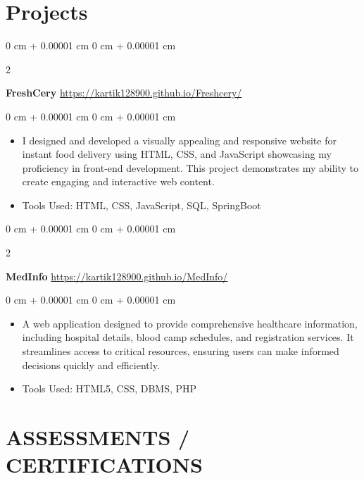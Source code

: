 \documentclass[10pt, letterpaper]{article}
\newenvironment{highlights}{
    \begin{itemize}[
        topsep=0.10 cm,
        parsep=0.10 cm,
        partopsep=0pt,
        itemsep=0pt,
        leftmargin=0 cm + 10pt
    ]
}{
    \end{itemize}
} %
\newenvironment{onecolentry}{
    \begin{adjustwidth}{
        0 cm + 0.00001 cm
    }{
        0 cm + 0.00001 cm
    }
}{
    \end{adjustwidth}
} %
\newenvironment{twocolentry}[2][]{
    \onecolentry
    \def\secondColumn{#2}
    \setcolumnwidth{\fill, 4.5 cm}
    \begin{paracol}{2}
}{
    \switchcolumn \raggedleft \secondColumn
    \end{paracol}
    \endonecolentry
} %
\begin{document}
    
    \section{Projects}



        
        \begin{twocolentry}{
            \href{https://github.com/sinaatalay/rendercv}{https://kartik128900.github.io/Freshcery/}
        }
            \textbf{FreshCery }\end{twocolentry}

        \begin{onecolentry}
            \begin{highlights}
                \item I designed and developed a visually appealing and responsive website for instant food delivery using HTML, CSS, and JavaScript showcasing my proficiency in front-end development. This project demonstrates my ability to create engaging and interactive web content.  
                \item Tools Used: HTML, CSS, JavaScript, SQL, SpringBoot 
            \end{highlights}
        \end{onecolentry}



        \begin{twocolentry}{
            \href{https://github.com/sinaatalay/rendercv}{https://kartik128900.github.io/MedInfo/}
        }
        
            \textbf{MedInfo }\end{twocolentry}

        \begin{onecolentry}
            \begin{highlights}
                \item A web application designed to provide comprehensive healthcare information, including hospital details, blood camp schedules, and registration services. It streamlines access to critical resources, ensuring users can make informed decisions quickly and efficiently.  
                \item Tools Used: HTML5, CSS, DBMS, PHP 
            \end{highlights}
        \end{onecolentry}





    
    \section{ASSESSMENTS / CERTIFICATIONS }
\end{document}
